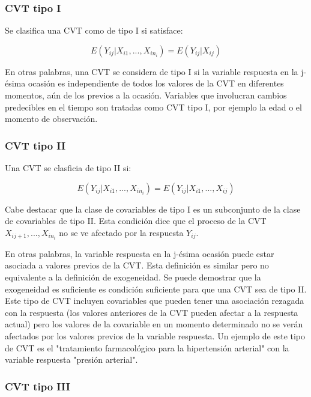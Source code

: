 \documentclass[12pt]{article}
\begin{document}
\subsubsection{CVT tipo I}

Se clasifica una CVT como de tipo I si satisface:

\begin{equation}
	\label{CVT tipo I}
	E(Y_{ij}|X_{i1}, ..., X_{in_i}) = E(Y_{ij}|X_{ij})
\end{equation}

En otras palabras, una CVT se considera de tipo I si la variable respuesta en la j-ésima ocasión es independiente de
todos los valores de la CVT en diferentes momentos, aún de los previos a la ocasión. Variables que involucran cambios
predecibles en el tiempo son tratadas como CVT tipo I, por ejemplo la edad o el momento de observación.

\subsubsection{CVT tipo II}

Una CVT se clasficia de tipo II si:

\begin{equation}
	\label{CVT tipo II}
	E(Y_{ij}|X_{i1}, ..., X_{in_i}) = E(Y_{ij}|X_{i1}, ..., X_{ij})
\end{equation}

Cabe destacar que la clase de covariables de tipo I es un subconjunto de la clase de covariables de tipo II. Esta
condición dice que el proceso de la CVT $X_{ij+1}, ..., X_{in_i}$ no se ve afectado por la respuesta $Y_{ij}$.

En otras palabras, la variable respuesta en la j-ésima ocasión puede estar asociada a valores previos de la CVT. Esta
definición es similar pero no equivalente a la definición de exogeneidad. Se puede demostrar que la exogeneidad es
suficiente es condición suficiente para que una CVT sea de tipo II. Este tipo de CVT incluyen covariables que pueden tener
una asociación rezagada con la respuesta (los valores anteriores de la CVT pueden afectar a la respuesta actual) pero los
valores de la covariable en un momento determinado no se verán afectados por los valores previos de la variable respuesta.
Un ejemplo de este tipo de CVT es el "tratamiento farmacológico para la hipertensión arterial" con la variable respuesta
"presión arterial".

\subsubsection{CVT tipo III}
\end{document}
